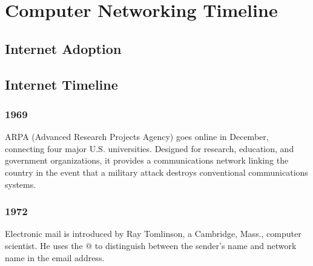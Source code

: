 \documentclass[letterpaper,12pt,english]{sphinxmanual}
\begin{document}
\chapter{Computer Networking Timeline}
\label{network-timeline:computer-networking-timeline}\label{network-timeline::doc}

\section{Internet Adoption}
\label{network-timeline:internet-adoption}


\section{Internet Timeline}
\label{network-timeline:internet-timeline}

\subsection{1969}
\label{network-timeline:id1}
ARPA (Advanced Research Projects Agency) goes online in December, connecting four major U.S. universities. Designed for research, education, and government organizations, it provides a communications network linking the country in the event that a military attack destroys conventional communications systems.


\subsection{1972}
\label{network-timeline:id2}
Electronic mail is introduced by Ray Tomlinson, a Cambridge, Mass., computer scientist. He uses the @ to distinguish between the sender's name and network name in the email address.
\end{document}
